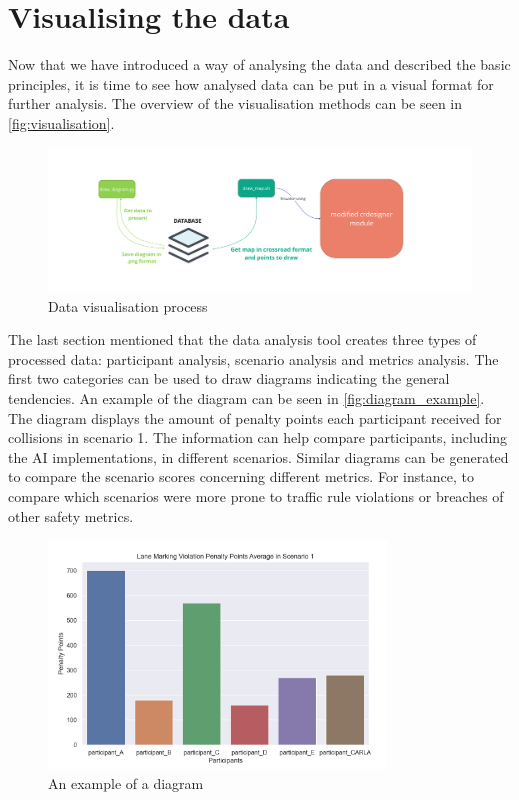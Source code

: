 \section{Visualising the data} \label{sect-7.2}

Now that we have introduced a way of analysing the data and described the basic principles, it is time to see how analysed data can be put in a visual format for further analysis. The overview of the visualisation methods can be seen in \autoref{fig:visualisation}.

\begin{figure} [h]
    \centering
    \includegraphics[width = \textwidth]{research_paper/Images/visualisation.png}
    \caption{Data visualisation process}
    \label{fig:visualisation}
\end{figure}

The last section mentioned that the data analysis tool creates three types of processed data: participant analysis, scenario analysis and metrics analysis. The first two categories can be used to draw diagrams indicating the general tendencies. An example of the diagram can be seen in \autoref{fig:diagram_example}. The diagram displays the amount of penalty points each participant received for collisions in scenario 1. The information can help compare participants, including the AI implementations, in different scenarios. Similar diagrams can be generated to compare the scenario scores concerning different metrics. For instance, to compare which scenarios were more prone to traffic rule violations or breaches of other safety metrics.

\begin{figure} [h]
    \centering
    \includegraphics[width = 0.8\textwidth]{research_paper/Images/diagram_example.png}
    \caption{An example of a diagram}
    \label{fig:diagram_example}
\end{figure}

